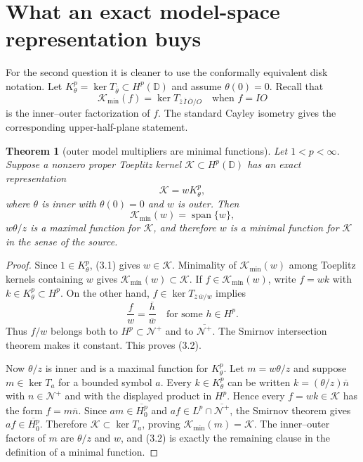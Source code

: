 \documentclass[11pt]{article}
\newtheorem{theorem}{Theorem}
\newcommand{\D}{\mathbb D}
\newcommand{\Kmin}{\mathcal K_{\min}}
\begin{document}
\section{What an exact model-space representation buys}

For the second question it is cleaner to use the conformally equivalent disk
notation.  Let $K_\theta^p=\ker T_{\overline\theta}\subset H^p(\D)$ and
assume $\theta(0)=0$.  Recall that
\[
 \Kmin(f)=\ker T_{\overline z\,\overline I\,\overline O/O}
 \quad\text{when } f=IO
\]
is the inner--outer factorization of $f$.  The standard Cayley isometry gives
the corresponding upper-half-plane statement.

\begin{theorem}[outer model multipliers are minimal functions]\label{thm:model}
Let $1<p<\infty$.  Suppose a nonzero proper Toeplitz kernel
$\mathcal K\subset H^p(\D)$ has an exact representation
\[
 \mathcal K=wK_\theta^p,                                               \tag{3.1}
\]
where $\theta$ is inner with $\theta(0)=0$ and $w$ is outer.  Then
\[
 \Kmin(w)=\operatorname{span}\{w\},                                   \tag{3.2}
\]
$w\theta/z$ is a maximal function for $\mathcal K$, and therefore $w$ is a
minimal function for $\mathcal K$ in the sense of the source.
\end{theorem}

\begin{proof}
Since $1\in K_\theta^p$, (3.1) gives $w\in\mathcal K$.  Minimality of
$\Kmin(w)$ among Toeplitz kernels containing $w$ gives
$\Kmin(w)\subset\mathcal K$.  If $f\in\Kmin(w)$, write $f=wk$ with
$k\in K_\theta^p\subset H^p$.  On the other hand,
$f\in\ker T_{\overline z\,\overline w/w}$ implies
\[
 \frac f w=\frac{\overline h}{\overline w}
 \quad\text{for some }h\in H^p.
\]
Thus $f/w$ belongs both to $H^p\subset\mathcal N^+$ and to
$\overline{\mathcal N^+}$.  The Smirnov intersection theorem makes it
constant.  This proves (3.2).

Now $\theta/z$ is inner and is a maximal function for $K_\theta^p$.  Let
$m=w\theta/z$ and suppose $m\in\ker T_a$ for a bounded symbol $a$.  Every
$k\in K_\theta^p$ can be written
$k=(\theta/z)\overline n$ with $n\in\mathcal N^+$ and with the displayed
product in $H^p$.  Hence every $f=wk\in\mathcal K$ has the form
$f=m\overline n$.  Since $am\in\overline{H_0^p}$ and
$af\in L^p\cap\overline{\mathcal N^+}$, the Smirnov theorem gives
$af\in\overline{H_0^p}$.  Therefore
$\mathcal K\subset\ker T_a$, proving $\Kmin(m)=\mathcal K$.  The
inner--outer factors of $m$ are $\theta/z$ and $w$, and (3.2) is exactly the
remaining clause in the definition of a minimal function.
\end{proof}
\end{document}
